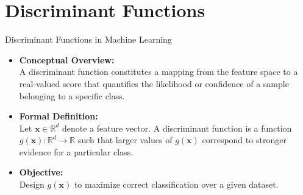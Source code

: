 \documentclass[serif, aspectratio=169]{beamer}
\begin{document}
    \section{Discriminant Functions}



    \begin{frame}{Discriminant Functions in Machine Learning}
        \begin{itemize}\itemsep1.2em
        \item \textbf{Conceptual Overview:}\\
        A discriminant function constitutes a mapping from the feature space to a real-valued score that quantifies the likelihood or confidence of a sample belonging to a specific class.
        \item \textbf{Formal Definition:}\\
        Let $\mathbf{x} \in \mathbb{R}^d$ denote a feature vector. A discriminant function is a function $g(\mathbf{x}) : \mathbb{R}^d \rightarrow \mathbb{R}$ such that larger values of $g(\mathbf{x})$ correspond to stronger evidence for a particular class.
        \item \textbf{Objective:}\\
        Design $g(\mathbf{x})$ to maximize correct classification over a given dataset.
        \end{itemize}
    \end{frame}
\end{document}
